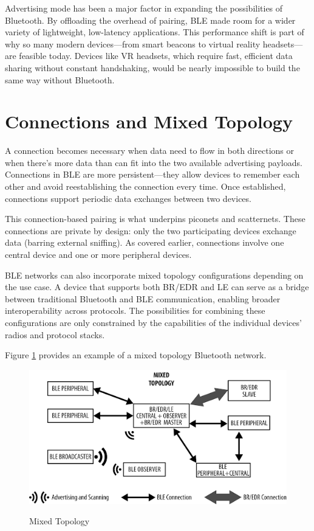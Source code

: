 Advertising mode has been a major factor in expanding the possibilities of Bluetooth. By offloading the overhead of pairing, BLE made room for a wider variety of lightweight, low-latency applications. This performance shift is part of why so many modern devices—from smart beacons to virtual reality headsets—are feasible today. Devices like VR headsets, which require fast, efficient data sharing without constant handshaking, would be nearly impossible to build the same way without Bluetooth.

\section{Connections and Mixed Topology}

A connection becomes necessary when data need to flow in both directions or when there’s more data than can fit into the two available advertising payloads. Connections in BLE are more persistent—they allow devices to remember each other and avoid reestablishing the connection every time. Once established, connections support periodic data exchanges between two devices.

This connection-based pairing is what underpins piconets and scatternets. These connections are private by design: only the two participating devices exchange data (barring external sniffing). As covered earlier, connections involve one central device and one or more peripheral devices.

BLE networks can also incorporate mixed topology configurations depending on the use case. A device that supports both BR/EDR and LE can serve as a bridge between traditional Bluetooth and BLE communication, enabling broader interoperability across protocols. The possibilities for combining these configurations are only constrained by the capabilities of the individual devices' radios and protocol stacks.

Figure \ref{fig:mixedtopology} provides an example of a mixed topology Bluetooth network.

\begin{figure}[H]
    \caption{Mixed Topology}
    \includegraphics[scale=.8]{mixedtopology.png}
    \label{fig:mixedtopology}
    \end{figure}

